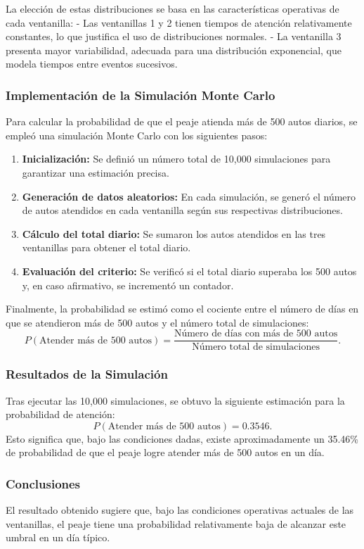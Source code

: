 \documentclass[12pt]{article}
\begin{document}
La elección de estas distribuciones se basa en las características operativas de cada ventanilla:
- Las ventanillas 1 y 2 tienen tiempos de atención relativamente constantes, lo que justifica el uso de distribuciones normales.
- La ventanilla 3 presenta mayor variabilidad, adecuada para una distribución exponencial, que modela tiempos entre eventos sucesivos.

\subsubsection{Implementación de la Simulación Monte Carlo}
Para calcular la probabilidad de que el peaje atienda más de 500 autos diarios, se empleó una simulación Monte Carlo con los siguientes pasos:
\begin{enumerate}
    \item \textbf{Inicialización:} Se definió un número total de 10,000 simulaciones para garantizar una estimación precisa.
    \item \textbf{Generación de datos aleatorios:} En cada simulación, se generó el número de autos atendidos en cada ventanilla según sus respectivas distribuciones.
    \item \textbf{Cálculo del total diario:} Se sumaron los autos atendidos en las tres ventanillas para obtener el total diario.
    \item \textbf{Evaluación del criterio:} Se verificó si el total diario superaba los 500 autos y, en caso afirmativo, se incrementó un contador.
\end{enumerate}

Finalmente, la probabilidad se estimó como el cociente entre el número de días en que se atendieron más de 500 autos y el número total de simulaciones:
\[
P(\text{Atender más de 500 autos}) = \frac{\text{Número de días con más de 500 autos}}{\text{Número total de simulaciones}}.
\]

\subsubsection{Resultados de la Simulación}
Tras ejecutar las 10,000 simulaciones, se obtuvo la siguiente estimación para la probabilidad de atención:
\[
P(\text{Atender más de 500 autos}) = 0.3546.
\]
Esto significa que, bajo las condiciones dadas, existe aproximadamente un 35.46\% de probabilidad de que el peaje logre atender más de 500 autos en un día.

\subsubsection*{Conclusiones}
El resultado obtenido sugiere que, bajo las condiciones operativas actuales de las ventanillas, el peaje tiene una probabilidad relativamente baja de alcanzar este umbral en un día típico.
\end{document}
